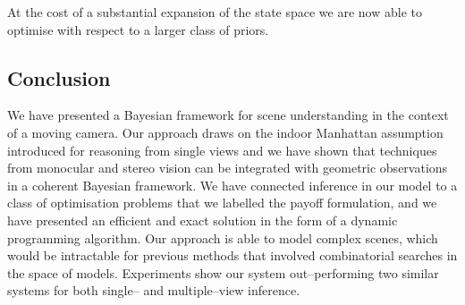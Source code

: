 At the cost of a substantial expansion of the state space we are
now able to optimise with respect to a larger class of priors.














\subsection{Conclusion}
We have presented a Bayesian framework for scene understanding in the
context of a moving camera. Our approach draws on the indoor Manhattan
assumption introduced for reasoning from single views and we have
shown that techniques from monocular and stereo vision can be
integrated with geometric observations in a coherent Bayesian
framework. We have connected inference in our model to a class of
optimisation problems that we labelled the payoff formulation, and we
have presented an efficient and exact solution in the form of a
dynamic programming algorithm. Our approach is able to model complex
scenes, which would be intractable for previous methods that involved
combinatorial searches in the space of models. Experiments show
our system out--performing two similar systems for both single-- and
multiple--view inference.
